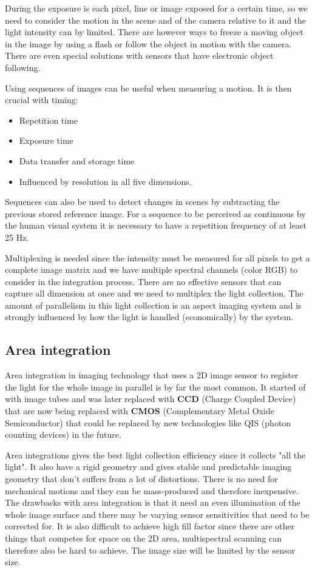 During the exposure is each pixel, line or image exposed for a certain time, so we need to consider the motion in the scene and of the camera relative to it and the light intensity can by limited. There are however ways to freeze a moving object in the image by using a flash or follow the object in motion with the camera. There are even special solutions with sensors that have electronic object following. 

Using sequences of images can be useful when measuring a motion. It is then crucial with timing:
\begin{itemize}
 	\item Repetition time
 	\item Exposure time
 	\item Data transfer and storage time
 	\item Influenced by resolution in all five dimensions. 
 \end{itemize} 
Sequences can also be used to detect changes in scenes by subtracting the previous stored reference image. For a sequence to be perceived as continuous by the human visual system it is necessary to have a repetition frequency of at least 25 Hz.

Multiplexing is needed since the intensity must be measured for all pixels to get a complete image matrix and we have multiple spectral channels (color RGB) to consider in the integration process. There are no effective sensors that can capture all dimension at once and we need to multiplex the light collection. The amount of parallelism in this light collection is an aspect imaging system and is strongly influenced by how the light is handled (economically) by the system. 

\subsection{Area integration}
Area integration in imaging technology that uses a 2D image sensor to register the light for the whole image in parallel is by far the most common. It started of with image tubes and was later replaced with \textbf{CCD} (Charge Coupled Device) that are now being replaced with \textbf{CMOS} (Complementary Metal Oxide Semiconductor) that could be replaced by new technologies like QIS (photon counting devices) in the future. 

Area integrations gives the best light collection efficiency since it collects "all the light". It also have a rigid geometry and gives stable and predictable imaging geometry that don't suffers from a lot of distortions. There is no need for mechanical motions and they can be mass-produced and therefore inexpensive. The drawbacks with area integration is that it need an even illumination of the whole image surface and there may be varying sensor sensitivities that need to be corrected for. It is also difficult to achieve high fill factor since there are other things that competes for space on the 2D area, multispectral scanning can therefore also be hard to achieve. The image size will be limited by the sensor size. 

